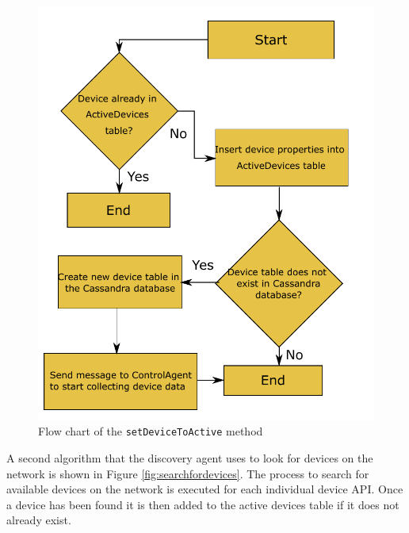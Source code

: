 \documentclass[letterpaper,12pt]{article}   %
\begin{document}
\begin{figure}[H]
    \centering
    \includegraphics[scale=0.5]{figs/agents/setDeviceToActiveFlow.pdf}
    \caption{Flow chart of the \texttt{setDeviceToActive} method}
    \label{fig:setdevicetoactive}
\end{figure}

A second algorithm that the discovery agent uses to look for devices on the network is shown in Figure \ref{fig:searchfordevices}. The process to search for available devices on the network is executed for each individual device API. Once a device has been found it is then added to the active devices table if it does not already exist.
\end{document}
